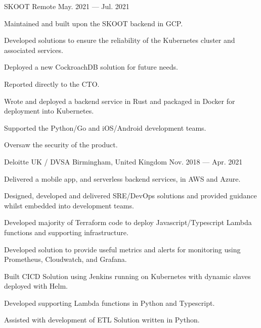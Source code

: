 \begin{cventries}
    {SKOOT}
    {Remote}
    {May. 2021 — Jul. 2021}
    {
        \begin{cvitems}
        \item{Maintained and built upon the SKOOT backend in GCP.}
        \item{Developed solutions to ensure the reliability of the Kubernetes cluster and associated services.}
        \item{Deployed a new CockroachDB solution for future needs.}
        \item{Reported directly to the CTO.}
        \item{Wrote and deployed a backend service in Rust and packaged in Docker for deployment into Kubernetes.}
        \item{Supported the Python/Go and iOS/Android development teams.}
        \item{Oversaw the security of the product.}
        \end{cvitems}
    }

    {Deloitte UK / DVSA}
    {Birmingham, United Kingdom}
    {Nov. 2018 — Apr. 2021}
    {
        \begin{cvitems}
        \item{Delivered a mobile app, and serverless backend services, in AWS and Azure.}
        \item{Designed, developed and delivered SRE/DevOps solutions and provided guidance whilst embedded into development teams.}
        \item{Developed majority of Terraform code to deploy Javascript/Typescript Lambda functions and supporting infrastructure.}
        \item{Developed solution to provide useful metrics and alerts for monitoring using Prometheus, Cloudwatch, and Grafana.}
        \item{Built CICD Solution using Jenkins running on Kubernetes with dynamic slaves deployed with Helm.}
        \item{Developed supporting Lambda functions in Python and Typescript.}
        \item{Assisted with development of ETL Solution written in Python.}
        \end{cvitems}
    }


\end{cventries}
